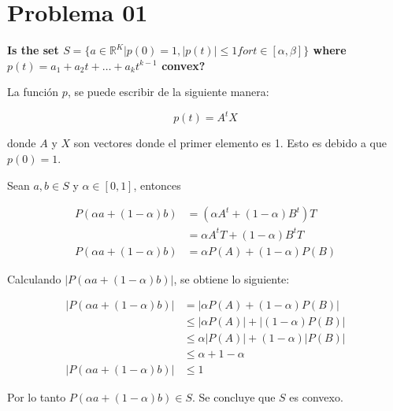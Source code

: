 \section*{Problema 01}

\textbf{Is the set $S =\{a \in \mathbb{R}^K | p(0)=1, |p(t)|\leq 1 for t \in [\alpha,\beta]\}$ where $p(t)=a_1 +a_2t +\dots+a_kt^{k-1}$ convex?}

La función $p$, se puede escribir de la siguiente manera:

\begin{equation*}
    p(t) = A^tX
\end{equation*}

donde $A$ y $X$ son vectores donde el primer elemento es 1. Esto es debido a que $p(0)=1$.

Sean $a,b \in S$ y $\alpha \in [0,1]$, entonces

\begin{align*}
    P(\alpha a + (1-\alpha)b) & = (\alpha A^t + (1-\alpha)B^t) T \\
                              & = \alpha A^t T + (1-\alpha) B^tT \\
    P(\alpha a + (1-\alpha)b) & =  \alpha P(A) + (1-\alpha) P(B)
\end{align*}

Calculando $|P(\alpha a + (1-\alpha)b)|$, se obtiene lo siguiente:

\begin{align*}
    |P(\alpha a + (1-\alpha)b)| & = |\alpha P(A) + (1-\alpha) P(B)|      \\
                                & \leq |\alpha P(A)| + |(1-\alpha) P(B)| \\
                                & \leq \alpha |P(A)| + (1-\alpha) |P(B)| \\
                                & \leq \alpha + 1 - \alpha               \\
    |P(\alpha a + (1-\alpha)b)| & \leq 1
\end{align*}

Por lo tanto $P(\alpha a + (1-\alpha)b) \in S$. Se concluye que $S$ es convexo.